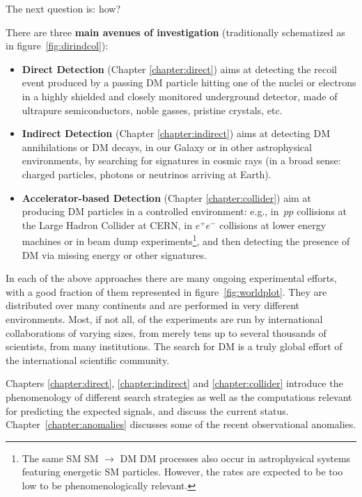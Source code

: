 \documentclass[twoside,12pt,openany]{book}
\begin{document}
The next question is: how?

There are three {\bf main avenues of investigation} 
(traditionally schematized as in figure~\ref{fig:dirindcol}): 
\begin{itemize} 
\item[$\circ$] {\bf Direct Detection} (Chapter \ref{chapter:direct}) aims at detecting the recoil event produced by a passing DM particle hitting one of the nuclei or electrons in a highly shielded and closely monitored underground detector, made of ultrapure semiconductors, noble gasses, pristine crystals, etc.
\item[$\circ$] {\bf Indirect Detection} (Chapter \ref{chapter:indirect}) aims at detecting DM annihilations or DM decays, in our Galaxy or in other astrophysical environments, by searching for signatures in cosmic rays (in a broad sense: charged particles, photons or neutrinos arriving at Earth).
\item[$\circ$] {\bf Accelerator-based Detection} (Chapter \ref{chapter:collider}) aim at producing DM particles in a controlled environment: e.g., in~$pp$ collisions at the Large Hadron Collider at CERN, in $e^+e^-$ collisions at lower energy machines or in beam dump experiments\footnote{The same SM SM $\to$ DM DM processes also occur in astrophysical systems featuring energetic SM particles. However, the rates are expected to be too low to be phenomenologically relevant.}, and then detecting the presence of DM via missing energy or other signatures. 
\end{itemize}
\noindent
In each of the above approaches there are many ongoing experimental efforts, with a good fraction of them represented in figure~\ref{fig:worldplot}.  They are distributed over many continents and are performed in very different environments. Most, if not all, of the experiments are run by international collaborations of varying sizes, from merely tens up to several thousands of scientists, from many institutions. The search for DM is a truly global effort of the international scientific community. 

\smallskip

Chapters \ref{chapter:direct}, \ref{chapter:indirect} and \ref{chapter:collider} introduce the phenomenology of different search strategies as well as the computations relevant for predicting the expected signals,
and discuss the current status.
Chapter~\ref{chapter:anomalies} discusses some of the recent observational anomalies.
\end{document}
